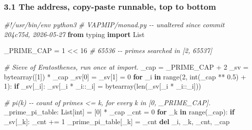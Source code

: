 \documentclass[
  10pt,
]{article}
\newenvironment{Shaded}{}{}
\newcommand{\BuiltInTok}[1]{\textcolor[rgb]{0.00,0.50,0.00}{#1}}
\newcommand{\CommentTok}[1]{\textcolor[rgb]{0.38,0.63,0.69}{\textit{#1}}}
\newcommand{\ControlFlowTok}[1]{\textcolor[rgb]{0.00,0.44,0.13}{\textbf{#1}}}
\newcommand{\DecValTok}[1]{\textcolor[rgb]{0.25,0.63,0.44}{#1}}
\newcommand{\FloatTok}[1]{\textcolor[rgb]{0.25,0.63,0.44}{#1}}
\newcommand{\ImportTok}[1]{\textcolor[rgb]{0.00,0.50,0.00}{\textbf{#1}}}
\newcommand{\KeywordTok}[1]{\textcolor[rgb]{0.00,0.44,0.13}{\textbf{#1}}}
\newcommand{\NormalTok}[1]{#1}
\newcommand{\OperatorTok}[1]{\textcolor[rgb]{0.40,0.40,0.40}{#1}}
\begin{document}
\hypertarget{the-address-copy-paste-runnable-top-to-bottom}{%
\subsubsection{3.1 The address, copy-paste runnable, top to
bottom}\label{the-address-copy-paste-runnable-top-to-bottom}}

\begin{Shaded}
\begin{Highlighting}[]
\CommentTok{\#!/usr/bin/env python3}
\CommentTok{\# VAPMIP/monad.py {-}{-} unaltered since commit 204c75d, 2026{-}05{-}27}
\ImportTok{from}\NormalTok{ typing }\ImportTok{import}\NormalTok{ List}

\NormalTok{\_PRIME\_CAP }\OperatorTok{=} \DecValTok{1} \OperatorTok{\textless{}\textless{}} \DecValTok{16}                      \CommentTok{\# 65536 {-}{-} primes searched in [2, 65537]}

\CommentTok{\# Sieve of Eratosthenes, run once at import.}
\NormalTok{\_cap }\OperatorTok{=}\NormalTok{ \_PRIME\_CAP }\OperatorTok{+} \DecValTok{2}
\NormalTok{\_sv }\OperatorTok{=} \BuiltInTok{bytearray}\NormalTok{([}\DecValTok{1}\NormalTok{]) }\OperatorTok{*}\NormalTok{ \_cap}
\NormalTok{\_sv[}\DecValTok{0}\NormalTok{] }\OperatorTok{=}\NormalTok{ \_sv[}\DecValTok{1}\NormalTok{] }\OperatorTok{=} \DecValTok{0}
\ControlFlowTok{for}\NormalTok{ \_i }\KeywordTok{in} \BuiltInTok{range}\NormalTok{(}\DecValTok{2}\NormalTok{, }\BuiltInTok{int}\NormalTok{(\_cap }\OperatorTok{**} \FloatTok{0.5}\NormalTok{) }\OperatorTok{+} \DecValTok{1}\NormalTok{):}
    \ControlFlowTok{if}\NormalTok{ \_sv[\_i]:}
\NormalTok{        \_sv[\_i }\OperatorTok{*}\NormalTok{ \_i::\_i] }\OperatorTok{=} \BuiltInTok{bytearray}\NormalTok{(}\BuiltInTok{len}\NormalTok{(\_sv[\_i }\OperatorTok{*}\NormalTok{ \_i::\_i]))}

\CommentTok{\# pi(k) {-}{-} count of primes \textless{}= k, for every k in [0, \_PRIME\_CAP].}
\NormalTok{\_prime\_pi\_table: List[}\BuiltInTok{int}\NormalTok{] }\OperatorTok{=}\NormalTok{ [}\DecValTok{0}\NormalTok{] }\OperatorTok{*}\NormalTok{ \_cap}
\NormalTok{\_cnt }\OperatorTok{=} \DecValTok{0}
\ControlFlowTok{for}\NormalTok{ \_k }\KeywordTok{in} \BuiltInTok{range}\NormalTok{(\_cap):}
    \ControlFlowTok{if}\NormalTok{ \_sv[\_k]:}
\NormalTok{        \_cnt }\OperatorTok{+=} \DecValTok{1}
\NormalTok{    \_prime\_pi\_table[\_k] }\OperatorTok{=}\NormalTok{ \_cnt}
\KeywordTok{del}\NormalTok{ \_i, \_k, \_cnt, \_cap}


\end{Highlighting}
\end{Shaded}
\end{document}
